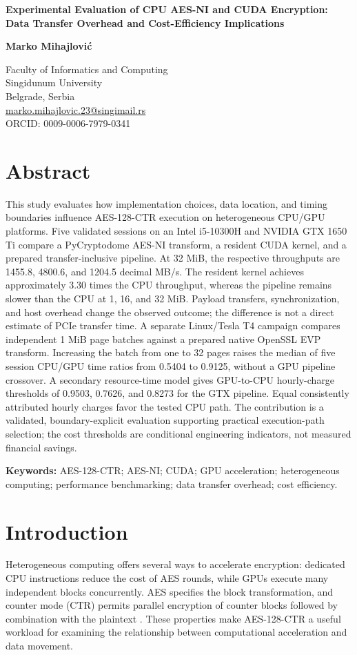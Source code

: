 \documentclass[11pt,a4paper]{article}
\begin{document}
\begin{center}
{\fontsize{15}{18}\selectfont\bfseries Experimental Evaluation of CPU AES-NI and CUDA Encryption: Data Transfer Overhead and Cost-Efficiency Implications\par}
\medskip
{\bfseries Marko Mihajlović\par}
Faculty of Informatics and Computing\\
Singidunum University\\
Belgrade, Serbia\\
\href{mailto:marko.mihajlovic.23@singimail.rs}{marko.mihajlovic.23@singimail.rs}\\
ORCID: 0009-0006-7979-0341
\end{center}

\section*{Abstract}
This study evaluates how implementation choices, data location, and timing boundaries influence AES-128-CTR execution on heterogeneous CPU/GPU platforms. Five validated sessions on an Intel i5-10300H and NVIDIA GTX 1650 Ti compare a PyCryptodome AES-NI transform, a resident CUDA kernel, and a prepared transfer-inclusive pipeline. At 32 MiB, the respective throughputs are 1455.8, 4800.6, and 1204.5 decimal MB/s. The resident kernel achieves approximately 3.30 times the CPU throughput, whereas the pipeline remains slower than the CPU at 1, 16, and 32 MiB. Payload transfers, synchronization, and host overhead change the observed outcome; the difference is not a direct estimate of PCIe transfer time. A separate Linux/Tesla T4 campaign compares independent 1 MiB page batches against a prepared native OpenSSL EVP transform. Increasing the batch from one to 32 pages raises the median of five session CPU/GPU time ratios from 0.5404 to 0.9125, without a GPU pipeline crossover. A secondary resource-time model gives GPU-to-CPU hourly-charge thresholds of 0.9503, 0.7626, and 0.8273 for the GTX pipeline. Equal consistently attributed hourly charges favor the tested CPU path. The contribution is a validated, boundary-explicit evaluation supporting practical execution-path selection; the cost thresholds are conditional engineering indicators, not measured financial savings.

\noindent\textbf{Keywords:} AES-128-CTR; AES-NI; CUDA; GPU acceleration; heterogeneous computing; performance benchmarking; data transfer overhead; cost efficiency.

\section{Introduction}
Heterogeneous computing offers several ways to accelerate encryption: dedicated CPU instructions reduce the cost of AES rounds, while GPUs execute many independent blocks concurrently. AES specifies the block transformation, and counter mode (CTR) permits parallel encryption of counter blocks followed by combination with the plaintext \citep{nist_aes2023,nist_ctr2001}. These properties make AES-128-CTR a useful workload for examining the relationship between computational acceleration and data movement.
\end{document}
